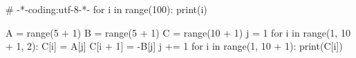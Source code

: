 \documentclass{article}
\begin{document}
\begin{python}
# -*-coding:utf-8-*-
for i in range(100):
    print(i)

A = range(5 + 1)
B = range(5 + 1)
C = range(10 + 1)
j = 1
for i in range(1, 10 + 1, 2):
    C[i] = A[j]
    C[i + 1] = -B[j]
    j += 1
for i in range(1, 10 + 1):
    print(C[i])
\end{python}
\end{document}
